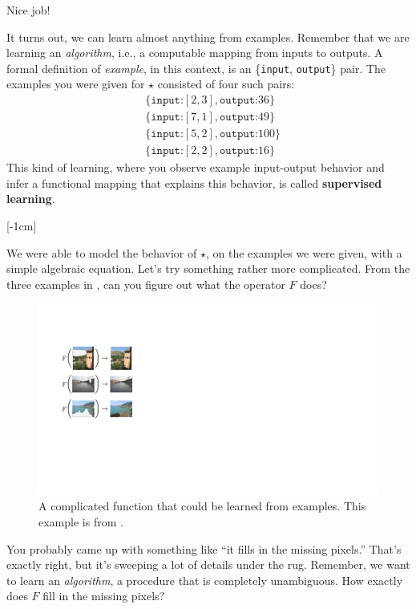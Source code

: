 Nice job!

It turns out, we can learn almost anything from examples.
Remember that we are learning an \emph{algorithm}, i.e., a computable mapping from inputs to outputs. A formal definition of \emph{example}, in this context, is an \{\texttt{input}, \texttt{output}\} pair. The examples you were given for $\star$ consisted of four such pairs:
\begin{align}
     & \{\texttt{input:} [2,3], \texttt{output:} 36\}\nonumber  \\
     & \{\texttt{input:} [7,1], \texttt{output:} 49\}\nonumber  \\
     & \{\texttt{input:} [5,2], \texttt{output:} 100\}\nonumber \\
     & \{\texttt{input:} [2,2], \texttt{output:}16\}\nonumber
\end{align}
This kind of learning, where you observe example input-output behavior and infer a functional mapping that explains this behavior, is called \textbf{supervised learning}.

[-1cm]

We were able to model the behavior of $\star$, on the examples we were given, with a simple algebraic equation. Let's try something rather more complicated. From the three examples in \fig{\ref{fig:intro_to_learning:inpainting_example}}, can you figure out what the operator $F$ does?

\begin{figure}[h]
    \centerline{
        \includegraphics[width=0.4\linewidth]{./figures/intro_to_learning/inpainting_example.pdf}
    }
    \caption{A complicated function that could be learned from examples. This example is from \cite{hays2007scene}. }
    \label{fig:intro_to_learning:inpainting_example}
\end{figure}

You probably came up with something like ``it fills in the missing pixels.'' That's exactly right, but it's sweeping a lot of details under the rug. Remember, we want to learn an \emph{algorithm}, a procedure that is completely unambiguous. How exactly does $F$ fill in the missing pixels?

